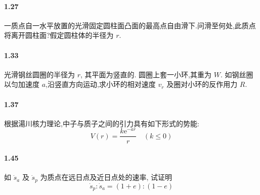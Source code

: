 \documentclass[UTF8,a4paper]{ctexart}
\begin{document}
\paragraph{1.27} 一质点自一水平放置的光滑固定圆柱面凸面的最高点自由滑下.问滑至何处,此质点将离开圆柱面?假定圆柱体的半径为 $ r $.

\paragraph{1.33} 光滑钢丝圆圈的半径为 $ r $, 其平面为竖直的. 圆圈上套一小环,其重为 $ W $. 如钢丝圈以匀加速度 $ a $,沿竖直方向运动,求小环的相对速度 $ v_r $ 及圈对小环的反作用力 $ R $.

\paragraph{1.37} 根据湯川核力理论,中子与质子之间的引力具有如下形式的势能: \[ V\left( r \right) = \frac{ k \mathrm{e}^{-ar}}{r} \quad \left( k \leq 0 \right)  \]


\paragraph{1.45} 如 $ \dot{s}_a $ 及 $ \dot{s}_p $ 为质点在远日点及近日点处的速率, 试证明\[ \dot{s}_p : \dot{s}_a = (1+e) : (1-e) \]
\end{document}
